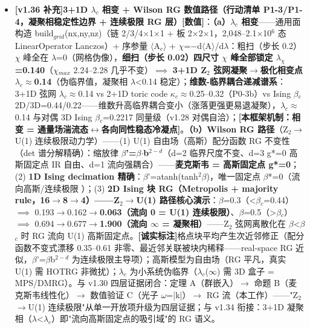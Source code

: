 \documentclass[12pt]{article}
\newcommand{\mtag}[1]{\textbf{[#1]}}
\newcommand{\up}[1]{\ensuremath{^{#1}}}
\newcommand{\down}[1]{\ensuremath{_{#1}}}
\begin{document}
\begin{itemize}
\item \textbf{\mtag{v1.36 补充}3+1D \ensuremath{\lambda}\down{c} 相变 + Wilson RG 数值路径（行动清单 P1-3/P1-4，凝聚相稳定性边界 + 连续极限 RG 层）}\mtag{数值}：\textbf{（a）\ensuremath{\lambda}\down{c} 相变}------通用面构造 build\down{grid}(nx,ny,nz)（链 2/3/4\ensuremath{\times}1\ensuremath{\times}1 + 板 2\ensuremath{\times}2\ensuremath{\times}1，2,048--2.1\ensuremath{\times}10\up{6} 态 LinearOperator Lanczos）+ 序参量 \ensuremath{\langle}A\down{c}\ensuremath{\rangle} + \ensuremath{\chi}=\ensuremath{-}d\ensuremath{\langle}A\ensuremath{\rangle}/d\ensuremath{\lambda}：粗扫（步长 0.2）\ensuremath{\chi} 峰全在 \ensuremath{\lambda}=0（网格伪像），\textbf{细扫（步长 0.02）四尺寸 \ensuremath{\chi} 峰全部锁定 \ensuremath{\lambda}\down{\chi{}}=0.140}（\ensuremath{\chi}\down{max} 2.24--2.28 几乎不变）\ensuremath{\implies} \textbf{3+1D Z\down{2} 弦网凝聚\ensuremath{\to}极化相变点 \ensuremath{\lambda}\down{c}\ensuremath{\approx}0.14}（伪临界值，凝聚相 \ensuremath{\lambda}<0.14 稳定）；\textbf{维数-临界耦合递减谱系}：3+1D 弦网 \ensuremath{\lambda}\down{c}\ensuremath{\approx}0.14 vs 2+1D toric code \ensuremath{\kappa}\down{c}\ensuremath{\approx}0.25--0.32（P0-3b）vs Ising \ensuremath{\beta}\down{c} 2D/3D=0.44/0.22------维数升高临界耦合变小（涨落更强更易退凝聚），\ensuremath{\lambda}\down{c}\ensuremath{\approx}0.14 与对偶 3D Ising \ensuremath{\beta}\down{c}=0.2217 同量级（v1.28 对偶自洽）；\mtag{本框架机制：相变 = 通量场湍流态\ensuremath{\leftrightarrow}各向同性稳态冷凝点}。\textbf{（b）Wilson RG 路径}（Z\down{2}\ensuremath{\to}U(1) 连续极限动力学）------(1) U(1) 自由场（高斯）配分函数 RG 不变性（det 谱分解精确）：缩放律 \textbf{\ensuremath{\beta}'=\ensuremath{\beta}\ensuremath{\cdot}b\up{2-d}}（d=2 临界尺度不变、d=3 g*=0 高斯固定点 IR 自由、d=1 流向强耦合）------\textbf{麦克斯韦 = 高斯固定点 g*=0}；(2) \textbf{1D Ising decimation 精确}：\ensuremath{\beta}'=atanh(tanh\up{2}\ensuremath{\beta})，唯一固定点 \ensuremath{\beta}*=0（流向高斯/连续极限 \checkmark）；(3) \textbf{2D Ising 块 RG（Metropolis + majority rule，16\ensuremath{\to}8\ensuremath{\to}4）------Z\down{2}\ensuremath{\to}U(1) 路径核心演示}：\ensuremath{\beta}=0.3（<\ensuremath{\beta}\down{c}=0.44）\ensuremath{\implies} 0.193\ensuremath{\to}0.162\ensuremath{\to}\textbf{0.063（流向 0 = U(1) 连续极限）}、\ensuremath{\beta}=0.5（>\ensuremath{\beta}\down{c}）\ensuremath{\implies} 0.694\ensuremath{\to}0.677\ensuremath{\to}\textbf{1.900（流向 \ensuremath{\infty} = 凝聚相）}------Z\down{2} 弦网离散化在 \ensuremath{\beta}<\ensuremath{\beta}\down{c} 时 RG 流向 U(1) 高斯固定点。\mtag{诚实标注}格点块平均产生次近邻修正（配分函数不变式漂移 0.35--0.61 非零、最近邻关联被块内稀释------real-space RG 近似，\ensuremath{\beta}'=\ensuremath{\beta}b\up{2-d} 为连续极限主导项）；高斯模型为自由场（RG 平凡，真实 U(1) 需 HOTRG 非微扰）；\ensuremath{\lambda}\down{c} 为小系统伪临界（\ensuremath{\lambda}\down{c}(\ensuremath{\infty}) 需 3D 盒子 = MPS/DMRG）。与 v1.30 四层证据闭合：定理 A（群嵌入）\ensuremath{\to} 命题 B（麦克斯韦线性化）\ensuremath{\to} 数值验证 C（光子 \ensuremath{\omega}=|k|）\ensuremath{\to} RG 流（本工作）------"Z\down{2}\ensuremath{\to}U(1) 连续极限"从单一开放项升级为四层证据；与 v1.34 衔接：3+1D 凝聚相（\ensuremath{\lambda}<\ensuremath{\lambda}\down{c}）即"流向高斯固定点的吸引域"的 RG 语义。

\end{itemize}
\end{document}
